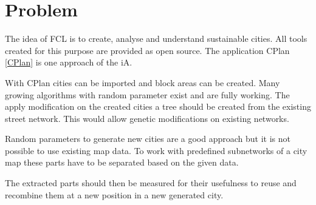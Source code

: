 \chapter{Problem}
The idea of \gls{FCL} is to create, analyse and understand sustainable cities. All tools created for this purpose are provided as open source. The application CPlan \ref{CPlan} is one approach of the \gls{iA}.

With CPlan cities can be imported and block areas can be created. Many growing algorithms with random parameter exist and are fully working. The apply modification on the created cities a tree should be created from the existing street network. This would allow genetic modifications on existing networks.

Random parameters to generate new cities are a good approach but it is not possible to use existing map data. To work with predefined subnetworks of a city map these parts have to be separated based on the given data.

The extracted parts should then be measured for their usefulness to reuse and recombine them at a new position in a new generated city.
